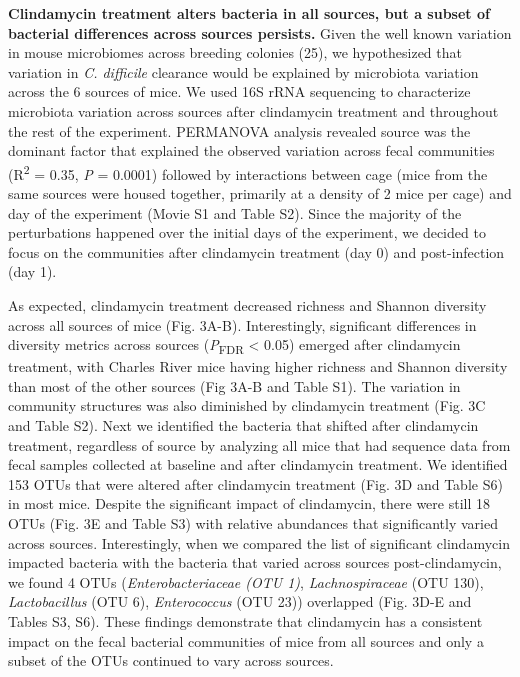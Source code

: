\documentclass[11pt,]{article}
\begin{document}
\textbf{Clindamycin treatment alters bacteria in all sources, but a
subset of bacterial differences across sources persists.} Given the well
known variation in mouse microbiomes across breeding colonies (25), we
hypothesized that variation in \emph{C. difficile} clearance would be
explained by microbiota variation across the 6 sources of mice. We used
16S rRNA sequencing to characterize microbiota variation across sources
after clindamycin treatment and throughout the rest of the experiment.
PERMANOVA analysis revealed source was the dominant factor that
explained the observed variation across fecal communities
(R\textsuperscript{2} = 0.35, \emph{P} = 0.0001) followed by
interactions between cage (mice from the same sources were housed
together, primarily at a density of 2 mice per cage) and day of the
experiment (Movie S1 and Table S2). Since the majority of the
perturbations happened over the initial days of the experiment, we
decided to focus on the communities after clindamycin treatment (day 0)
and post-infection (day 1).

As expected, clindamycin treatment decreased richness and Shannon
diversity across all sources of mice (Fig. 3A-B). Interestingly,
significant differences in diversity metrics across sources
(\emph{P}\textsubscript{FDR} \textless{} 0.05) emerged after clindamycin
treatment, with Charles River mice having higher richness and Shannon
diversity than most of the other sources (Fig 3A-B and Table S1). The
variation in community structures was also diminished by clindamycin
treatment (Fig. 3C and Table S2). Next we identified the bacteria that
shifted after clindamycin treatment, regardless of source by analyzing
all mice that had sequence data from fecal samples collected at baseline
and after clindamycin treatment. We identified 153 OTUs that were
altered after clindamycin treatment (Fig. 3D and Table S6) in most mice.
Despite the significant impact of clindamycin, there were still 18 OTUs
(Fig. 3E and Table S3) with relative abundances that significantly
varied across sources. Interestingly, when we compared the list of
significant clindamycin impacted bacteria with the bacteria that varied
across sources post-clindamycin, we found 4 OTUs
(\emph{Enterobacteriaceae (OTU 1)}, \emph{Lachnospiraceae} (OTU 130),
\emph{Lactobacillus} (OTU 6), \emph{Enterococcus} (OTU 23)) overlapped
(Fig. 3D-E and Tables S3, S6). These findings demonstrate that
clindamycin has a consistent impact on the fecal bacterial communities
of mice from all sources and only a subset of the OTUs continued to vary
across sources.
\end{document}
